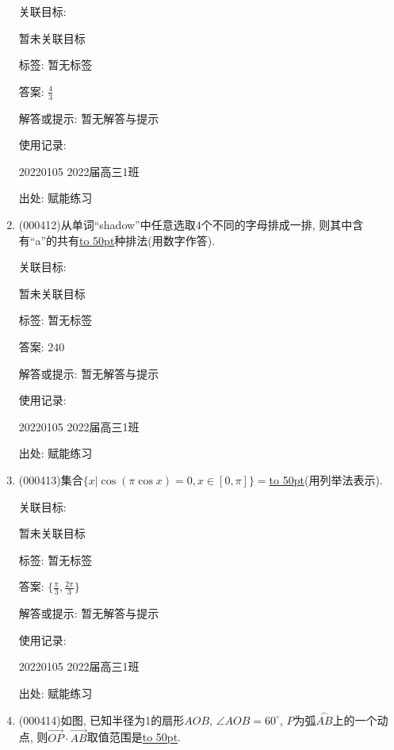 \documentclass[10pt,a4paper]{article}
\newcommand{\blank}[1]{\underline{\hbox to #1pt{}}}
\begin{document}
\begin{enumerate}[1.]
关联目标:

暂未关联目标



标签: 暂无标签

答案: $\frac 43$

解答或提示: 暂无解答与提示

使用记录:

20220105	2022届高三1班	


出处: 赋能练习
\item { (000412)}从单词``shadow''中任意选取$4$个不同的字母排成一排, 则其中含有``a''的共有\blank{50}种排法(用数字作答).


关联目标:

暂未关联目标



标签: 暂无标签

答案: $240$

解答或提示: 暂无解答与提示

使用记录:

20220105	2022届高三1班	


出处: 赋能练习
\item { (000413)}集合$\{x|\cos (\pi \cos x)=0,x\in [0,\pi]\}=$\blank{50}(用列举法表示).


关联目标:

暂未关联目标



标签: 暂无标签

答案: $\{\frac{\pi }3,\frac{2\pi }3\}$

解答或提示: 暂无解答与提示

使用记录:

20220105	2022届高三1班	


出处: 赋能练习
\item { (000414)}如图, 已知半径为1的扇形$AOB$, $\angle AOB=60^\circ$, $P$为弧$\overset\frown{AB}$上的一个动点, 则$\overrightarrow{OP}\cdot \overrightarrow{AB}$取值范围是\blank{50}.
\begin{center}
\end{center}



\end{enumerate}
\end{document}
